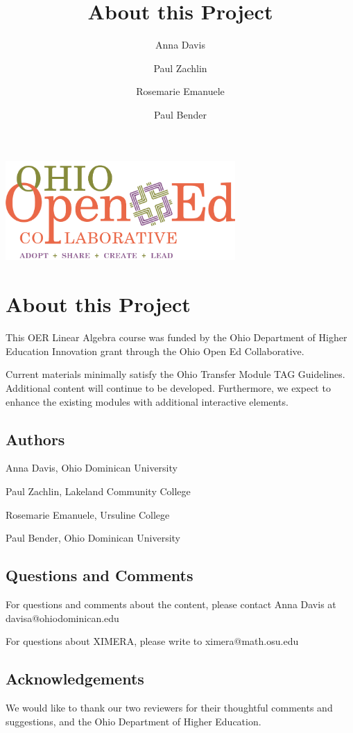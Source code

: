 \documentclass{ximera}
\author{Anna Davis \and Paul Zachlin \and Rosemarie Emanuele \and Paul Bender} \title{About this Project}
\begin{document}
\includegraphics[height=1.5in]{ooec.jpg}

\section{About this Project}

This OER Linear Algebra course was funded by the Ohio Department of Higher Education Innovation grant through the Ohio Open Ed Collaborative. 

Current materials minimally satisfy the Ohio Transfer Module TAG Guidelines.  Additional content will continue to be developed.  Furthermore, we expect to enhance the existing modules with additional interactive elements.

\subsection{Authors}
Anna Davis, Ohio Dominican University

Paul Zachlin, Lakeland Community College

Rosemarie Emanuele, Ursuline College

Paul Bender, Ohio Dominican University

\subsection{Questions and Comments}
For questions and comments about the content, please contact Anna Davis at davisa@ohiodominican.edu

For questions about XIMERA, please write to ximera@math.osu.edu

\subsection{Acknowledgements}
We would like to thank our two reviewers for their thoughtful comments and suggestions, and the Ohio Department of Higher Education.
\end{document}
